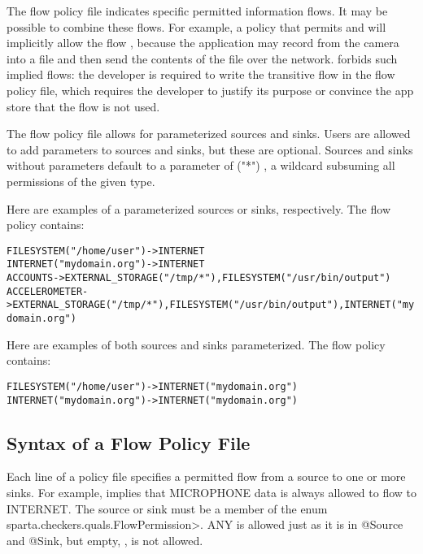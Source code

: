\label{sec:flow-policy-transitivity}
The flow policy file indicates specific permitted information flows.  It
may be possible to combine these flows.
For example, a policy that permits
 and 
will implicitly allow the flow ,
because the application may record from the camera into a file
and then send the contents of the file over the network.
\TheFlowChecker forbids such implied flows:  the developer is required to write
the transitive flow in the flow policy file, which requires the developer
to justify its purpose or convince the app store that the flow is not used.

\label{sec:flow-policy-parameterized}
The flow policy file allows for parameterized sources and sinks. Users
are allowed to add parameters to sources and sinks, but these are optional.
Sources and sinks without parameters default to a parameter of ("*") , a 
wildcard subsuming all permissions of the given type.\newline

\noindent
Here are examples of a parameterized sources or sinks, respectively.
The flow policy contains:
\begin{alltt}
  FILESYSTEM("/home/user") -> INTERNET
  INTERNET("mydomain.org") -> INTERNET
  ACCOUNTS      -> EXTERNAL_STORAGE("/tmp/*"), FILESYSTEM("/usr/bin/output")
  ACCELEROMETER -> EXTERNAL_STORAGE("/tmp/*"), FILESYSTEM("/usr/bin/output"), INTERNET("mydomain.org")
\end{alltt}

\noindent
Here are examples of both sources and sinks parameterized.
The flow policy contains:
\begin{alltt}
  FILESYSTEM("/home/user") -> INTERNET("mydomain.org")
  INTERNET("mydomain.org") -> INTERNET("mydomain.org")
\end{alltt}

\subsection{Syntax of a Flow Policy File}

Each line of a policy file specifies a permitted flow from a source to one
or more sinks.  For example,
 implies that
MICROPHONE data is always allowed to flow to INTERNET.
The source or sink must be a member of the enum
\<sparta.checkers.quals.FlowPermission>.  
ANY is allowed just as it is in @Source and @Sink, but empty, \ttcbs, is not allowed.

